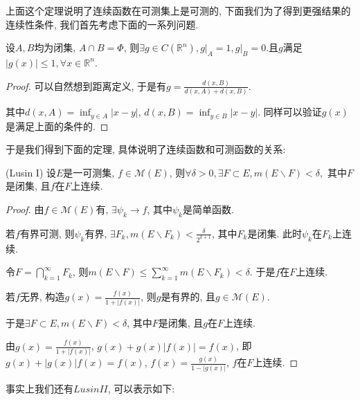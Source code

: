 \documentclass[theorem=false,mathfont=none,openany,sub3section]{easybook}
\begin{document}
上面这个定理说明了连续函数在可测集上是可测的, 下面我们为了得到更强结果的连续性条件, 我们首先考虑下面的一系列问题.\par

\begin{lemma}
  设$A,B$均为闭集, $A\cap B=\Phi$, 则$\exists g\in C(\mathbb{R}^n), \left.g\right|_A=1, \left.g\right|_B=0$.且$g$满足$|g(x)|\leqslant 1,\forall x\in \mathbb{R}^n$. \par
\end{lemma}

\begin{proof}
  可以自然想到距离定义, 于是有$g=\frac{d(x,B)}{d(x,A)+d(x,B)}$.\par
  其中$d(x,A)=\inf_{y\in A}|x-y|$, $d(x,B)=\inf_{y\in B}|x-y|$. 同样可以验证$g(x)$是满足上面的条件的.\par
\end{proof}

于是我们得到下面的定理, 具体说明了连续函数和可测函数的关系:\par

\begin{theorem}
  (Lusin I) 设$E$是一可测集, $f\in \mathcal{M} (E)$, 则$\forall \delta >0, \exists F\subset E, m(E\backslash F)<\delta,$ 其中$F$是闭集, 且$f$在$F$上连续.\par
\end{theorem}

\begin{proof}
  由$f\in \mathcal{M} (E)$有, $\exists \psi_k \rightarrow f$, 其中$\psi_k$是简单函数.\par
  若$f$有界可测, 则$\psi_k$有界, $\exists F_k, m(E\backslash F_k)<\frac{\delta}{2^{k+1}}$, 其中$F_k$是闭集. 此时$\psi_k$在$F_k$上连续.\par
  令$F=\bigcap_{k=1}^{\infty}F_k$, 则$m(E\backslash F)\leqslant \sum_{k=1}^{\infty}m(E\backslash F_k)<\delta$. 于是$f$在$F$上连续.\par
  若$f$无界, 构造$g(x)=\frac{f(x)}{1+|f(x)|}$, 则$g$是有界的, 且$g\in \mathcal{M} (E)$.\par
  于是$\exists F\subset E, m(E\backslash F)<\delta$, 其中$F$是闭集, 且$g$在$F$上连续.\par
  由$g(x)=\frac{f(x)}{1+|f(x)|}$, $g(x)+g(x)|f(x)|=f(x)$, 即$g(x)+|g(x)|f(x)=f(x)$, $f(x)=\frac{g(x)}{1-|g(x)|}$, $f$在$F$上连续.\par
\end{proof}

事实上我们还有$Lusin II$, 可以表示如下:\par
\end{document}
